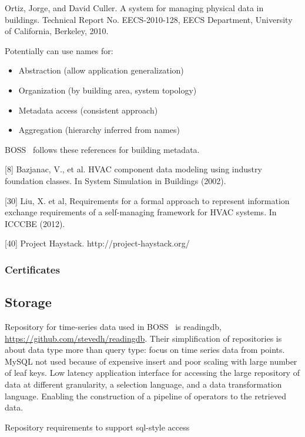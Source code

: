 Ortiz, Jorge, and David Culler. A system for managing physical data in buildings. Technical Report No. EECS-2010-128, EECS Department, University of California, Berkeley, 2010.

Potentially can use names for:
\begin{itemize}
\item Abstraction (allow application generalization)
\item Organization (by building area, system topology) 
\item Metadata access (consistent approach)
\item Aggregation (hierarchy inferred from names) 
\end{itemize} 



BOSS~\cite{Dawson-Haggerty2013BOSS} follows these references for building metadata. 

[8] Bazjanac, V., et al. HVAC component data modeling using industry foundation classes. In System Simulation in Buildings (2002). 

[30] Liu, X. et al, Requirements for a formal approach to represent information exchange requirements of a self-managing framework for HVAC systems. In ICCCBE (2012). 

[40] Project Haystack. http://project-haystack.org/  


\subsubsection{Certificates}

\subsection{Storage}

Repository for time-series data used in BOSS~\cite{Dawson-Haggerty2013BOSS} is readingdb, \url{https://github.com/stevedh/readingdb}.
Their simplification of repositories is about data type more than query type:  focus on time series data from points. 
MySQL not used because of expensive insert and poor scaling with large number of leaf keys.
Low latency application interface for accessing the large repository of data at different granularity, a selection language, and a data transformation language. Enabling the construction of a pipeline of operators to the retrieved data. 

Repository requirements to support sql-style access

